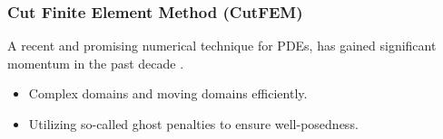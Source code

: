 \begin{frame}
\frametitle{Cut Finite Element Method (CutFEM)}

A recent and promising numerical technique for PDEs, has gained significant momentum in the past decade \footnotemark[1]\footnotemark[2].

\begin{block}{}
    \begin{itemize}
        \item  Complex domains and moving domains efficiently.
        \item Utilizing so-called ghost penalties to ensure well-posedness.
    \end{itemize}
\end{block}

\end{frame}









